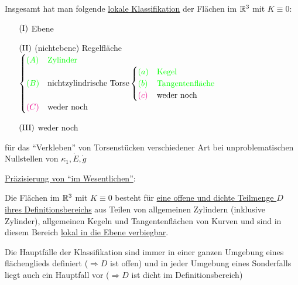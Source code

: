 Insgesamt hat man folgende \uline{lokale Klassifikation} der Flächen im \(\mathbb{R}^3\) mit \(K \equiv 0\):
\begin{enumerate}
 \item[{\color{green}\((\Rom1)\)}] {\color{green}Ebene}
 \item[{\color{green}\((\Rom2)\)}] (nichtebene) Regelfläche \(\begin{cases}
                                                             {\color{green}(A)} &{\color{green}\text{Zylinder}} \\
                                                             {\color{green}(B)} & \text{nichtzylindrische Torse} \begin{cases}
														{\color{green}(a)} &{\color{green}\text{Kegel}}\\
														{\color{green}(b)} &{\color{green}\text{Tangentenfläche}} \\
														{\color{magenta}(c)} &\text{weder noch}
													       \end{cases} \\
							      {\color{magenta}(C)}&\text{weder noch}
                                                            \end{cases}\)
 \item[{\color{magenta}\((\Rom3)\)}] weder noch
\end{enumerate}

\begin{bsp}
 für das ``Verkleben'' von Torsenstücken verschiedener Art bei unproblematischen Nullstellen von \(\kappa_1, \dot E, \dot g\)
\end{bsp}

\uline{Präzisierung von ``im Wesentlichen''}:

\begin{satz}\label{satz265}
 Die Flächen im \(\mathbb{R}^3\) mit \(K \equiv 0\) besteht für \uline{eine offene und dichte Teilmenge \(D\) ihres Definitionsbereichs} aus Teilen von allgemeinen Zylindern (inklusive Zylinder), allgemeinen Kegeln und Tangentenflächen von Kurven und sind in diesem Bereich \uline{lokal in die Ebene verbiegbar}.
\end{satz}

\begin{beweis}
 Die Hauptfälle der Klassifikation sind immer in einer ganzen Umgebung eines flächenglieds definiert (\(\Rightarrow D\) ist offen) und in jeder Umgebung eines Sonderfalls liegt auch ein Hauptfall vor (\(\Rightarrow D\) ist dicht im Definitionsbereich)
\end{beweis}

